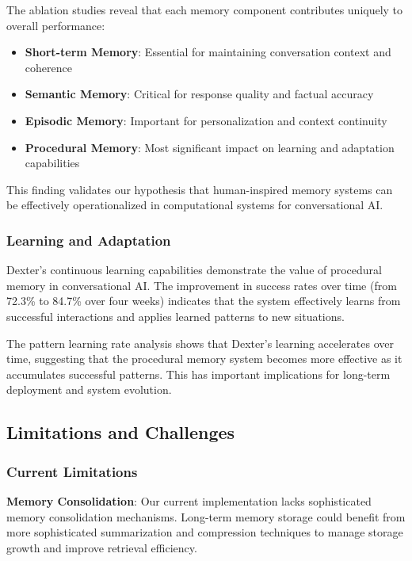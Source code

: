 \documentclass[11pt]{article}
\begin{document}
The ablation studies reveal that each memory component contributes uniquely to overall performance:

\begin{itemize}
\item \textbf{Short-term Memory}: Essential for maintaining conversation context and coherence
\item \textbf{Semantic Memory}: Critical for response quality and factual accuracy
\item \textbf{Episodic Memory}: Important for personalization and context continuity
\item \textbf{Procedural Memory}: Most significant impact on learning and adaptation capabilities
\end{itemize}

This finding validates our hypothesis that human-inspired memory systems can be effectively operationalized in computational systems for conversational AI.

\subsubsection{Learning and Adaptation}

Dexter's continuous learning capabilities demonstrate the value of procedural memory in conversational AI. The improvement in success rates over time (from 72.3\% to 84.7\% over four weeks) indicates that the system effectively learns from successful interactions and applies learned patterns to new situations.

The pattern learning rate analysis shows that Dexter's learning accelerates over time, suggesting that the procedural memory system becomes more effective as it accumulates successful patterns. This has important implications for long-term deployment and system evolution.

\subsection{Limitations and Challenges}

\subsubsection{Current Limitations}

\textbf{Memory Consolidation}: Our current implementation lacks sophisticated memory consolidation mechanisms. Long-term memory storage could benefit from more sophisticated summarization and compression techniques to manage storage growth and improve retrieval efficiency.
\end{document}
